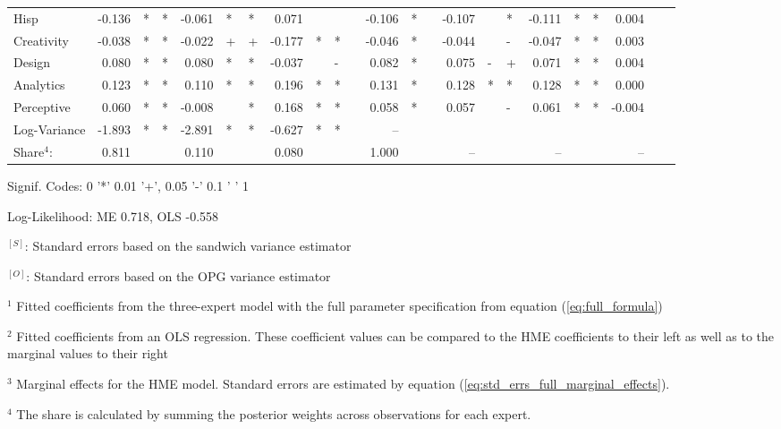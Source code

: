\documentclass[12pt]{article}
\theoremstyle{definition}
\begin{document}
\begin{landscape}
\begin{table}
\begin{threeparttable}
\begin{tabular}[l]{l r l l r l l r l l c r l c r l l r l l r l l}
  Hisp                  & -0.136 & * & * & -0.061 & *  & * &  0.071 &    &   && -0.106 & *     && -0.107 &   & *    & -0.111 & *  & *   &  0.004 &   &     \\
  Creativity            & -0.038 & * & * & -0.022 & +  & + & -0.177 & *  & * && -0.046 & *     && -0.044 &   & -    & -0.047 & *  & *   &  0.003 &   &     \\
  Design                &  0.080 & * & * &  0.080 & *  & * & -0.037 &    & - &&  0.082 & *     &&  0.075 & - & +    &  0.071 & *  & *   &  0.004 &   &     \\
  Analytics             &  0.123 & * & * &  0.110 & *  & * &  0.196 & *  & * &&  0.131 & *     &&  0.128 & * & *    &  0.128 & *  & *   &  0.000 &   &     \\
  Perceptive            &  0.060 & * & * & -0.008 &    & * &  0.168 & *  & * &&  0.058 & *     &&  0.057 &   & -    &  0.061 & *  & *   & -0.004 &   &     \\
  Log-Variance          & -1.893 & * & * & -2.891 & *  & * & -0.627 & *  & * &&  --    &       &&        &   &      &        &    &     &        &   &     \\
                        \cmidrule(l){2-4} \cmidrule(l){5-7} \cmidrule(l){8-10} \cmidrule(l){12-13} \cmidrule(l){15-17} \cmidrule(l){18-20} \cmidrule(l){21-23}
  Share$^{4}$:          & 0.811  &   &   & 0.110  &    &   &  0.080 &    &   &&  1.000 &       &&  --    &   &      &  --    &    &     &  --    &   &     \\
  \hline
        \end{tabular}
        \begin{tablenotes}
          \item Signif. Codes: 0 '*' 0.01 '+', 0.05 '-' 0.1 ' ' 1
          \item Log-Likelihood: ME 0.718, OLS -0.558
          \item $^{[S]}$: Standard errors based on the sandwich variance estimator
          \item $^{[O]}$: Standard errors based on the OPG variance estimator
          \item $^{1}$ Fitted coefficients from the three-expert model with the full parameter specification from equation (\ref{eq:full_formula})
          \item $^{2}$ Fitted coefficients from an OLS regression. These coefficient values can be compared to the HME coefficients to their left as well as to the marginal values to their right
          \item $^{3}$ Marginal effects for the HME model. Standard errors are estimated by equation (\ref{eq:std_errs_full_marginal_effects}).
          \item $^{4}$ The share is calculated by summing the posterior weights across observations for each expert.
  
        \end{tablenotes} \label{tbl:3W_full_regressions_results}
      \end{threeparttable}
  \end{table}
  \end{landscape}
  
\end{document}
